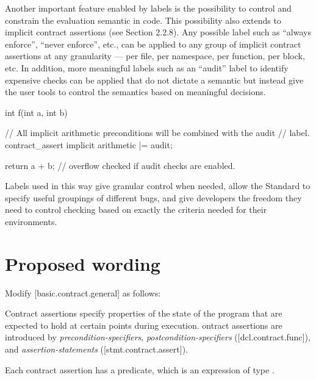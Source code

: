 Another important feature enabled by labels is the possibility to control and constrain the evaluation semantic in code. This possibility also extends to implicit contract assertions (see \cite{P3400R1} Section 2.2.8). Any possible label such as ``always enforce'', ``never enforce'', etc., can be applied to any group of implicit contract assertions at any granularity --- per file, per namespace, per function, per block, etc.  In addition, more meaningful labels such as an ``audit'' label to identify expensive checks can be applied that do not dictate a semantic but instead give the user tools to control the semantics based on meaningful decisions.

\begin{codeblock}
int f(int a, int b)
{
    // All implicit arithmetic preconditions will be combined with the audit
    // label.
    contract_assert implicit arithmetic |= audit;

    return a + b;  // overflow checked if audit checks are enabled.
}
\end{codeblock}

Labels used in this way give granular control when needed, allow the Standard to
specify useful groupings of different bugs, and give developers the freedom they
need to control checking based on exactly the criteria needed for their environments.

\section{Proposed wording}
\label{wording}

Modify [basic.contract.general] as follows:

\begin{adjustwidth}{0.5cm}{0.5cm}
Contract assertions specify properties of the state of the program
that are expected to hold at certain points during execution. ontract assertions
are introduced by \emph{precondition-specifiers}, \emph{postcondition-specifiers} ([dcl.contract.func]),
and \emph{assertion-statements} ([stmt.contract.assert]). 

Each contract assertion has a predicate, which is an expression of type . 
\begin{note}
\end{note}
\end{adjustwidth}

